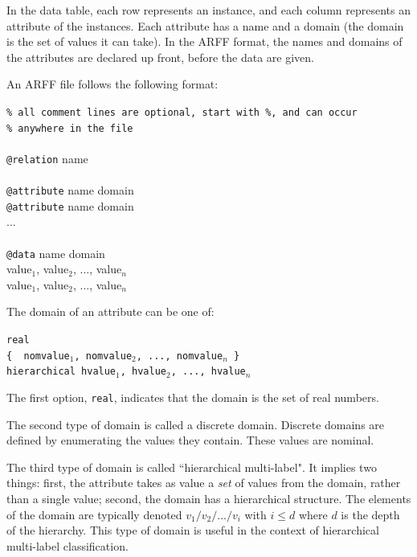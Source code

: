 \documentclass[a4paper]{report}
\begin{document}
In the data table, each row represents an instance, and each column represents an attribute of the instances.  Each attribute has a name and a domain (the domain is the set of values it can take).  In the ARFF format, the names and domains of the attributes are declared up front, before the data are given.

An ARFF file follows the following format:

\begin{tabbing}
{\tt \% all comment lines are optional, start with \%, and can occur }\\
{\tt \% anywhere in the file}\\
\\
{\tt @relation} name\\
\\
{\tt @attribute} name domain\\
{\tt @attribute} name domain\\
...\\
\\
{\tt @data} name domain\\
value$_1$, value$_2$, ..., value$_n$\\
value$_1$, value$_2$, ..., value$_n$\\
\end{tabbing}

The domain of an attribute can be one of:
\begin{tabbing}
\tt real\\
{\tt \{ } nomvalue$_1$, nomvalue$_2$, ..., nomvalue$_n$ {\tt \} }\\
{\tt hierarchical} hvalue$_1$, hvalue$_2$, ..., hvalue$_n$
\end{tabbing}

The first option, {\tt real}, indicates that the domain is the set of real numbers.

The second type of domain is called a discrete domain.  Discrete domains are defined by enumerating the values they contain.  These values are nominal.

The third type of domain is called ``hierarchical multi-label".  It implies two things: first, the attribute takes as value a {\em set} of values from the domain, rather than a single value; second, the domain has a hierarchical structure.  The elements of the domain are typically denoted $v_1/v_2/.../v_i$ with $i \leq d$ where $d$ is the depth of the hierarchy.  This type of domain is useful in the context of hierarchical multi-label classification.  
\end{document}
